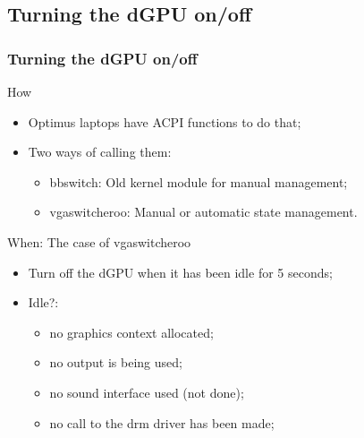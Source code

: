 \documentclass[11pt,english,compress]{beamer}
\begin{document}
\subsection{Turning the dGPU on/off}
\begin{frame}
	\frametitle{Turning the dGPU on/off}

	\begin{block}{How}
		\begin{itemize}
			\item Optimus laptops have ACPI functions to do that;
			\item Two ways of calling them:
			\begin{itemize}
				\item bbswitch: Old kernel module for manual management;
				\item vgaswitcheroo: Manual or automatic state management.
			\end{itemize}
		\end{itemize}
	\end{block}

	\begin{block}{When: The case of vgaswitcheroo}
		\begin{itemize}
			\item Turn off the dGPU when it has been idle for 5 seconds;
			\item Idle?: 
			\begin{itemize}
				\item no graphics context allocated;
				\item no output is being used;
				\item no sound interface used (not done);
				\item no call to the drm driver has been made;
			\end{itemize}
		\end{itemize}
	\end{block}
\end{frame}
\end{document}
